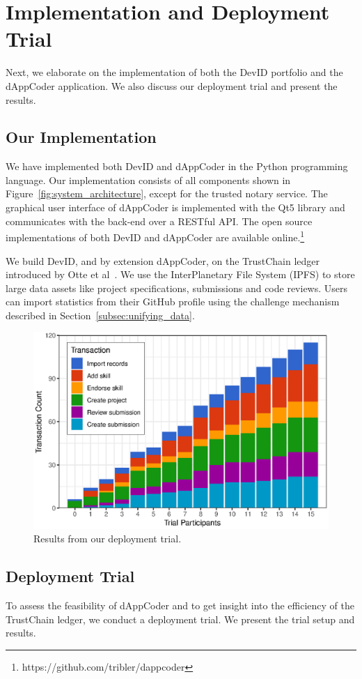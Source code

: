 \section{Implementation and Deployment Trial}
\label{sec:experiments}
Next, we elaborate on the implementation of both the DevID portfolio and the dAppCoder application.
We also discuss our deployment trial and present the results.

\subsection{Our Implementation}
We have implemented both DevID and dAppCoder in the Python programming language.
Our implementation consists of all components shown in Figure~\ref{fig:system_architecture}, except for the trusted notary service.
The graphical user interface of dAppCoder is implemented with the Qt5 library and communicates with the back-end over a RESTful API.
The open source implementations of both DevID and dAppCoder are available online.\footnote{https://github.com/tribler/dappcoder}

We build DevID, and by extension dAppCoder, on the TrustChain ledger introduced by Otte et al~\cite{otte2017trustchain}.
We use the InterPlanetary File System (IPFS) to store large data assets like project specifications, submissions and code reviews.
Users can import statistics from their GitHub profile using the challenge mechanism described in Section~\ref{subsec:unifying_data}.

\begin{figure}[t!]
	\centering
	\includegraphics[width=.75\columnwidth]{devid/resources/experiment/experiment_1_unit.eps}
	\caption{Results from our deployment trial.}
	\label{fig:experiment_graph}
\end{figure}

\subsection{Deployment Trial}
To assess the feasibility of dAppCoder and to get insight into the efficiency of the TrustChain ledger, we conduct a deployment trial.
We present the trial setup and results.

